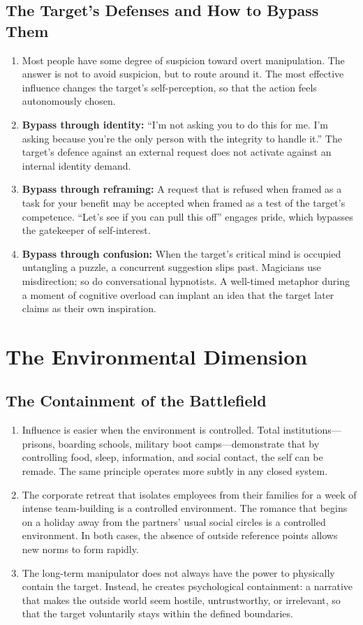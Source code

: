 \documentclass[12pt,a4paper,oneside]{book}
\begin{document}
\section{The Target's Defenses and How to Bypass Them}
\begin{enumerate}[leftmargin=*, label=\arabic*.]
\item Most people have some degree of suspicion toward overt manipulation. The answer is not to avoid suspicion, but to route around it. The most effective influence changes the target's self-perception, so that the action feels autonomously chosen.
\item \textbf{Bypass through identity:} “I'm not asking you to do this for me. I'm asking because you're the only person with the integrity to handle it.” The target's defence against an external request does not activate against an internal identity demand.
\item \textbf{Bypass through reframing:} A request that is refused when framed as a task for your benefit may be accepted when framed as a test of the target's competence. “Let's see if you can pull this off” engages pride, which bypasses the gatekeeper of self-interest.
\item \textbf{Bypass through confusion:} When the target's critical mind is occupied untangling a puzzle, a concurrent suggestion slips past. Magicians use misdirection; so do conversational hypnotists. A well-timed metaphor during a moment of cognitive overload can implant an idea that the target later claims as their own inspiration.
\end{enumerate}

\chapter{The Environmental Dimension}
\section{The Containment of the Battlefield}
\begin{enumerate}[leftmargin=*, label=\arabic*.]
\item Influence is easier when the environment is controlled. Total institutions—prisons, boarding schools, military boot camps—demonstrate that by controlling food, sleep, information, and social contact, the self can be remade. The same principle operates more subtly in any closed system.
\item The corporate retreat that isolates employees from their families for a week of intense team-building is a controlled environment. The romance that begins on a holiday away from the partners' usual social circles is a controlled environment. In both cases, the absence of outside reference points allows new norms to form rapidly.
\item The long-term manipulator does not always have the power to physically contain the target. Instead, he creates psychological containment: a narrative that makes the outside world seem hostile, untrustworthy, or irrelevant, so that the target voluntarily stays within the defined boundaries.
\end{enumerate}
\end{document}
